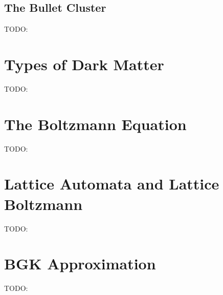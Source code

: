 \subsection{The Bullet Cluster}
TODO:
\section{Types of Dark Matter}
TODO:
\section{The Boltzmann Equation}
TODO:
\section{Lattice Automata and Lattice Boltzmann}
TODO:
\section{BGK Approximation}
\label{bgk}
TODO:
